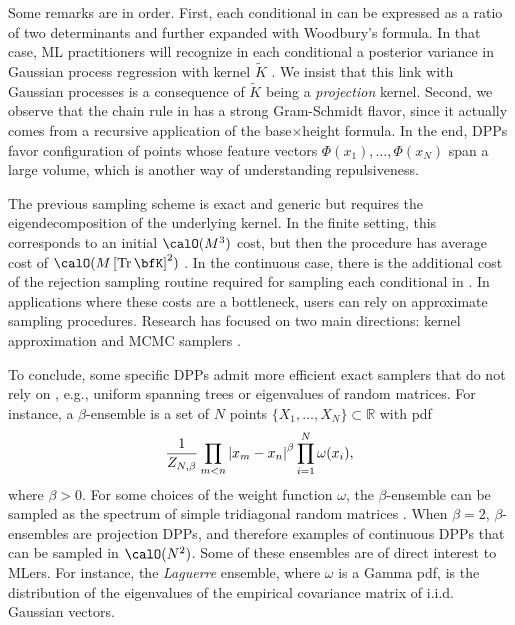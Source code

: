\documentclass[twoside,11pt]{article}
\begin{document}
      Some remarks are in order.
      First, each conditional in  can be expressed as a ratio of two determinants and further expanded with Woodbury's formula.
      In that case, ML practitioners will recognize in each conditional a posterior variance in Gaussian process regression with kernel $\tilde K$ \cite[Equation 2.26]{RaWi06}.
      We insist that this link with Gaussian processes is a consequence of $\tilde K$ being a \emph{projection} kernel.
      Second, we observe that the chain rule in  has a strong Gram-Schmidt flavor, since it actually comes from a recursive application of the base$\times$height formula.
      In the end, DPPs favor configuration of points whose feature vectors $\Phi(x_1),\dots, \Phi(x_N)$ span a large volume, which is another way of understanding repulsiveness.

      The previous sampling scheme is exact and generic but requires the eigendecomposition of the underlying kernel.
      In the finite setting, this corresponds to an initial $\calO(M^3)$ cost, but then the procedure has average cost of $\calO(M\lrb{\Tr \bfK}^2)$
      \citep{TrBaAm18}.
      In the continuous case, there is the additional cost of the rejection sampling routine required for sampling each conditional in .
      In applications where these costs are a bottleneck, users can rely on approximate sampling procedures.
      Research has focused on two main directions: kernel approximation \citep{AKFT13} and MCMC samplers \citep{AnGhRe16, LiJeSr16c, GaBaVa17}.

      To conclude, some specific DPPs admit more efficient exact samplers that do not rely on , e.g., uniform spanning trees \citep{PrWi98} or eigenvalues of random matrices.
      For instance, a $\beta$-ensemble is a set of $N$ points $\{X_1,\dots,X_N\}\subset\mathbb{R}$ with pdf
      \begin{equation*}
        \frac{1}{Z_{N,\beta}} \prod_{m< n}
        \left| x_m-x_n \right|^{\beta}
        \prod_{i= 1}^N
          \omega(x_i),
      \end{equation*}
      where $\beta>0$.
      For some choices of the weight function $\omega$, the $\beta$-ensemble can be sampled as the spectrum of simple tridiagonal random matrices \citep{DuEd02,KiNe04}.
      When $\beta=2$, $\beta$-ensembles are projection DPPs, and therefore examples of continuous DPPs that can be sampled in $\calO(N^2)$.
      Some of these ensembles are of direct interest to MLers.
      For instance, the \emph{Laguerre} ensemble, where $\omega$ is a Gamma pdf, is the distribution of the eigenvalues of the empirical covariance matrix of i.i.d. Gaussian vectors.
\end{document}
